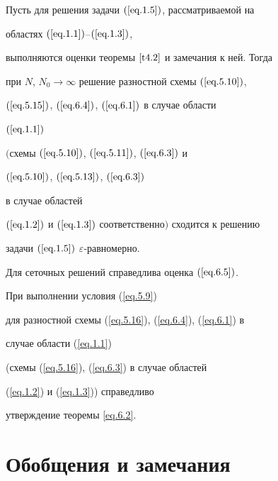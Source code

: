 \begin{thms} \label{t6.2}


Пусть для решения задачи $(\ref{eq.1.5})$, рассматриваемой на


областях $(\ref{eq.1.1})$--$(\ref{eq.1.3})$,


выполняются оценки теоремы $\ref{t4.2}$ и замечания к ней. Тогда


при $N$, $N_0\to \infty$ решение разностной схемы $(\ref{eq.5.10})$,


$(\ref{eq.5.15})$, $(\ref{eq.6.4})$, $(\ref{eq.6.1})$ в случае области


$(\ref{eq.1.1})$


$($схемы $(\ref{eq.5.10})$, $(\ref{eq.5.11})$, $(\ref{eq.6.3})$ и


$(\ref{eq.5.10})$, $(\ref{eq.5.13})$, $(\ref{eq.6.3})$


в случае областей


$(\ref{eq.1.2})$ и $(\ref{eq.1.3})$ соответственно$)$ сходится к решению


задачи $(\ref{eq.1.5})$\; $\varepsilon$-равномерно.


Для сеточных решений справедлива оценка $(\ref{eq.6.5})$.


\end{thms}





\begin{notenonum}


При выполнении условия (\ref{eq.5.9})


для разностной схемы (\ref{eq.5.16}), (\ref{eq.6.4}), (\ref{eq.6.1}) в


случае области (\ref{eq.1.1})


(схемы (\ref{eq.5.16}), (\ref{eq.6.3}) в случае областей


(\ref{eq.1.2}) и (\ref{eq.1.3})) справедливо


утверждение теоремы \ref{eq.6.2}.


\end{notenonum}





\section{Обобщения и замечания}


\label{section.7}





